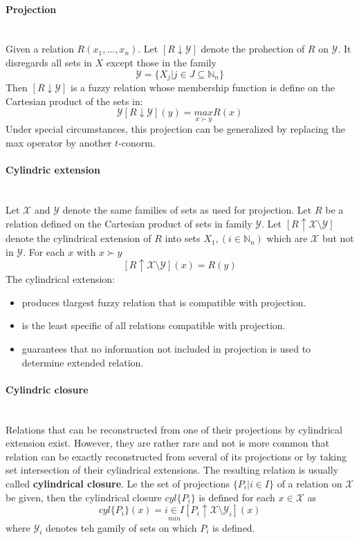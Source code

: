 \documentclass{article}
\begin{document}
\paragraph{Projection}\mbox{}\\
Given a relation $R(x_1,...,x_n)$. Let $[R\downarrow\mathcal{Y}]$ denote the prohection of $R$ on $\mathcal{Y}$.
It disregards all sets in $X$ except those in the family
$$\mathcal{Y}=\{X_j|j\in J\subseteq\mathbb{N}_n\}$$
Then $[R\downarrow\mathcal{Y}]$ is a fuzzy relation whose membership function is define on the Cartesian
product of the sets in:
$$\mathcal{Y}[R\downarrow\mathcal{Y}](y)=\underset{x\succ y}{max }R(x)$$
Under special circumstances, this projection can be generalized by replacing the max operator by another
$t$-conorm.

\paragraph{Cylindric extension}\mbox{}\\
Let $\mathcal{X}$ and $\mathcal{Y}$ denote the same families of sets as used for projection. Let
$R$ be a relation defined on the Cartesian product of sets in family $\mathcal{Y}$.
Let $[R\uparrow\mathcal{X}\setminus\mathcal{Y}]$ denote the cylindrical extension of $R$ into sets
$X_1,(i\in\mathbb{N}_n)$ which are $\mathcal{X}$ but not in $\mathcal{Y}$. For each $x$ with
$x\succ y$
$$[R\uparrow\mathcal{X}\setminus\mathcal{Y}](x)= R(y)$$
The cylindrical extension:
\begin{itemize}
    \item produces tlargest fuzzy relation that is compatible with projection.
    \item is the least specific of all relations compatible with projection.
    \item guarantees that no information not included in projection is used to determine extended relation.
\end{itemize}

\paragraph{Cylindric closure}\mbox{}\\
Relations that can be reconstructed from one of their projections by cylindrical extension exist. However,
they are rather rare and not is more common that relation can be exactly reconstructed from several
of its projections or by taking set intersection of their cylindrical extensions.
\newline\newline
The resulting relation is usually called \textbf{cylindrical closure}. Le the set of projections
$\{P_i|i\in I\}$ of a relation on $\mathcal{X}$ be given, then the cylindrical closure $cyl\{P_i\}$
is defined for each $x\in\mathcal{X}$ as
$$cyl\{P_i\}(x)=\underset{min}{i\in I}[P_i\uparrow\mathcal{X}\setminus\mathcal{Y}_i](x)$$
where $\mathcal{Y}_i$ denotes teh gamily of sets on which $P_i$ is defined.
\end{document}

